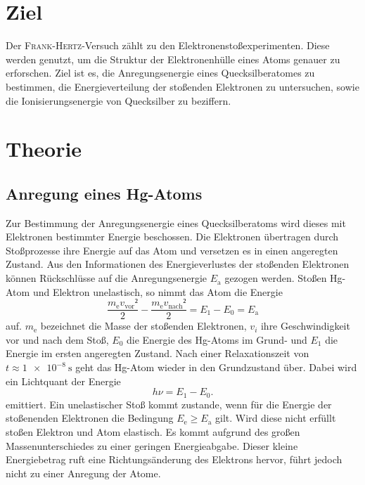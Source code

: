 \section{Ziel}
\label{sec:Ziel}
Der \textsc{Frank}-\textsc{Hertz}-Versuch zählt zu den Elektronenstoßexperimenten. 
Diese werden genutzt, um die Struktur der Elektronenhülle eines Atoms genauer zu erforschen.
Ziel ist es, die Anregungsenergie eines Quecksilberatomes zu bestimmen, die Energieverteilung der stoßenden Elektronen zu untersuchen, sowie die Ionisierungsenergie von Quecksilber zu beziffern.

\section{Theorie}
\label{sec:Theorie}
\subsection{Anregung eines Hg-Atoms}
Zur Bestimmung der Anregungsenergie eines Quecksilberatoms wird dieses mit Elektronen bestimmter Energie beschossen.
Die Elektronen übertragen durch Stoßprozesse ihre Energie auf das Atom und versetzen es in einen angeregten Zustand.
Aus den Informationen des Energieverlustes der stoßenden Elektronen können Rückschlüsse auf die Anregungsenergie $E_\mathup{a}$ gezogen werden. 
Stoßen Hg-Atom und Elektron unelastisch, so nimmt das Atom die Energie
\begin{equation}
	\label{eq:E_a}
	\frac{m_\mathup{e} v_\mathup{vor}²}{2}-\frac{m_\mathup{e} 	v_\mathup{nach}²}{2}=E_1-E_0=E_\mathup{a}
\end{equation}
auf.
$m_\mathup{e}$ bezeichnet die Masse der stoßenden Elektronen, $v_i$ ihre Geschwindigkeit vor und nach dem Stoß, $E_0$ die Energie des Hg-Atoms im Grund- und $E_1$ die Energie im ersten angeregten Zustand. 
Nach einer Relaxationszeit von $t \approx \SI{1e-8}{\second}$ geht das Hg-Atom wieder in den Grundzustand über. Dabei wird ein Lichtquant der Energie
\begin{equation}
	h \nu =E_1-E_0.
\end{equation}
emittiert.
Ein unelastischer Stoß kommt zustande, wenn für die Energie der stoßenenden Elektronen die Bedingung $E_\mathup{e} \geq E_\mathup{a}$ gilt. 
Wird diese nicht erfüllt stoßen Elektron und Atom elastisch. 
Es kommt aufgrund des großen Massenunterschiedes zu einer geringen Energieabgabe.
Dieser kleine Energiebetrag ruft eine Richtungsänderung des Elektrons hervor, führt jedoch nicht zu einer Anregung der Atome.

